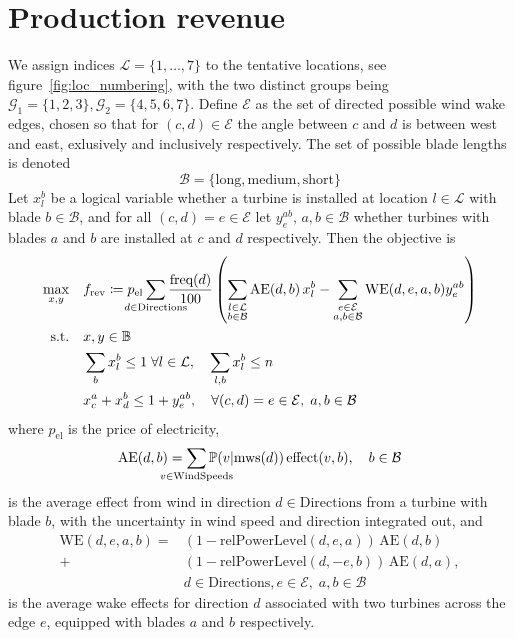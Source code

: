 \documentclass{article}
\begin{document}
\section{Production revenue}\label{sec:prod_revenue}
We assign indices $\mathcal L = \{1, \ldots, 7\}$ to the tentative locations,
see figure~\ref{fig:loc_numbering}, with the two distinct groups being
$ \mathcal G_1 = \{1, 2, 3\}, \mathcal G_2 = \{4, 5, 6, 7\}$.
Define $\mathcal E$ as the set of directed possible wind wake edges,
chosen so that for $(c, d) \in \mathcal E$ the angle between $c$ and $d$
is between west and east, exlusively and inclusively respectively.
The set of possible blade lengths is denoted
$$ \mathcal B = \{\text{long}, \text{medium}, \text{short}\} $$
Let $x_l^b$ be a logical variable whether
a turbine is installed at location $l \in \mathcal L$
with blade $b \in \mathcal B$,
and for all $(c, d) = e \in \mathcal E$ let $y_e^{ab}, \, a, b \in \mathcal B$
whether turbines with blades $a$ and $b$ are installed at $c$ and $d$ respectively.
Then the objective is
\begin{align*}
	\max_{x, y} \quad & f_\text{rev} \coloneqq p_\text{el}\sum_{\mathclap{d \in \text{Directions}}} \frac{\text{freq}(d)}{100} \left( \sum_{\substack{l \in \mathcal L \\ b \in \mathcal B}} \text{AE}(d, b) \, x_l^b - \sum_{\substack{e \in \mathcal E \\ a,b \in \mathcal B}} \text{WE}(d, e, a, b) y_e^{ab} \right) \\
	\text{s.t.} \quad & x, y \in \mathbb B \\
	& \sum_b x_l^b \le 1 \; \forall l \in \mathcal L, \quad \sum_{l, b} x_l^b \le n \\
	& x_c^a + x_d^b \le 1 + y_e^{ab}, \quad \forall (c, d) = e \in \mathcal E, \; a, b \in \mathcal B
\end{align*}
where $p_\text{el}$ is the price of electricity,
$$ \text{AE}(d, b) = \sum_{\mathclap{v \in \text{WindSpeeds}}} \mathbb P(v \vert \text{mws}(d)) \, \text{effect}(v, b), \quad b \in \mathcal B $$
is the average effect from wind in direction $d \in \text{Directions}$
from a turbine with blade $b$,
with the uncertainty in wind speed and direction integrated out, and
\begin{align*}
	\text{WE}(d, e, a, b) = &(1 - \text{relPowerLevel}(d, e, a)) \, \text{AE}(d, b) \\
	+ &(1 - \text{relPowerLevel}(d, -e, b)) \, \text{AE}(d, a), \\
	& d \in \text{Directions}, e \in \mathcal E, \; a,b \in \mathcal B
\end{align*}
is the average wake effects for direction $d$ associated with two turbines
across the edge $e$, equipped with blades $a$ and $b$ respectively.
\end{document}

